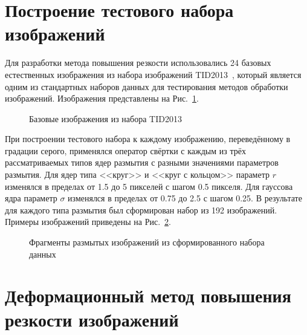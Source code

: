 \section{Построение тестового набора изображений}

Для разработки метода повышения резкости использовались 24 базовых естественных изображения из набора изображений TID2013~\cite{ponomarenko2015image}, который является одним из стандартных наборов данных для тестирования методов обработки изображений. Изображения представлены на Рис.~\ref{fig:tid2013-db}.

\begin{figure}[ht]
	\caption{Базовые изображения из набора TID2013}
	\label{fig:tid2013-db}
\end{figure}

При построении тестового набора к каждому изображению, переведённому в градации серого, применялся оператор свёртки с каждым из трёх рассматриваемых типов ядер размытия с разными значениями параметров размытия. Для ядер типа <<круг>> и <<круг с кольцом>> параметр $r$ изменялся в пределах от 1.5 до 5 пикселей с шагом 0.5 пикселя. Для гауссова ядра параметр $\sigma$ изменялся в пределах от 0.75 до 2.5 с шагом 0.25.
В результате для каждого типа размытия был сформирован набор из 192 изображений. Примеры изображений приведены на Рис.~\ref{fig:blurry-examples}.

\begin{figure}[ht]
	\caption{Фрагменты размытых изображений из сформированного набора данных}
	\label{fig:blurry-examples}
\end{figure}


\section{Деформационный метод повышения резкости изображений}

